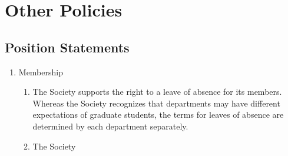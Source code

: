 \section{Other Policies}

\subsection{Position Statements}
\begin{enumerate}
\item Membership
\begin{enumerate}
\item The Society supports the right to a leave of absence for its members. Whereas the Society recognizes that departments may have different expectations of graduate students, the terms for leaves of absence are determined by each department separately.
\item The Society
\end{enumerate}
\end{enumerate}

